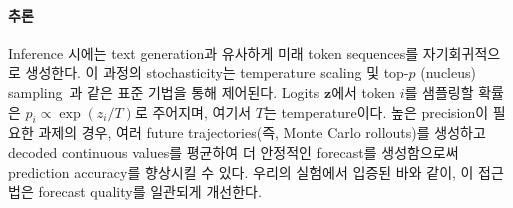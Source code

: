\paragraph{추론} Inference 시에는 text generation과 유사하게 미래 token sequences를 자기회귀적으로 생성한다. 이 과정의 stochasticity는 temperature scaling 및 top-$p$ (nucleus) sampling~\cite{holtzman2019curious}과 같은 표준 기법을 통해 제어된다. Logits $\mathbf{z}$에서 token $i$를 샘플링할 확률은 $p_i \propto \exp(z_i / T)$로 주어지며, 여기서 $T$는 temperature이다. 높은 precision이 필요한 과제의 경우, 여러 future trajectories(즉, Monte Carlo rollouts)를 생성하고 decoded continuous values를 평균하여 더 안정적인 forecast를 생성함으로써 prediction accuracy를 향상시킬 수 있다. 우리의 실험에서 입증된 바와 같이, 이 접근법은 forecast quality를 일관되게 개선한다.

